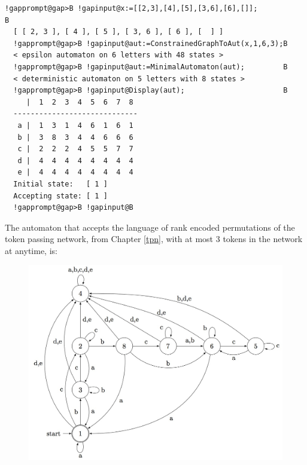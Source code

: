 \documentclass[a4paper,11pt]{report}
\begin{document}
{{{\begin{Verbatim}[commandchars=!@B,fontsize=\small,frame=single,label=Example]
  !gapprompt@gap>B !gapinput@x:=[[2,3],[4],[5],[3,6],[6],[]];                      B
  [ [ 2, 3 ], [ 4 ], [ 5 ], [ 3, 6 ], [ 6 ], [  ] ]
  !gapprompt@gap>B !gapinput@aut:=ConstrainedGraphToAut(x,1,6,3);B
  < epsilon automaton on 6 letters with 48 states >
  !gapprompt@gap>B !gapinput@aut:=MinimalAutomaton(aut);         B
  < deterministic automaton on 5 letters with 8 states >
  !gapprompt@gap>B !gapinput@Display(aut);                       B
     |  1  2  3  4  5  6  7  8  
  -----------------------------
   a |  1  3  1  4  6  1  6  1  
   b |  3  8  3  4  4  6  6  6  
   c |  2  2  2  4  5  5  7  7  
   d |  4  4  4  4  4  4  4  4  
   e |  4  4  4  4  4  4  4  4  
  Initial state:   [ 1 ]
  Accepting state: [ 1 ]
  !gapprompt@gap>B !gapinput@B
\end{Verbatim}
 
      The automaton that accepts the language of rank encoded permutations of the token passing network, from Chapter \ref{tpn}, 
      with at most 3 tokens in the network at anytime, is:
      \begin{figure}[H] \begin{center} \leavevmode \includegraphics[scale=0.75]{img/hexc3aut.jpg} \end{center} \end{figure}
      }

 }

 }

 
\end{document}
